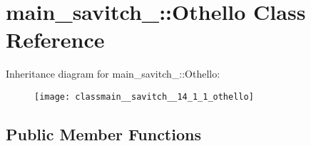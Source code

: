 \hypertarget{classmain__savitch__14_1_1_othello}{}\section{main\+\_\+savitch\+\_\+:\+:Othello Class Reference}
\label{classmain__savitch__14_1_1_othello}
Inheritance diagram for main\+\_\+savitch\+\_\+:\+:Othello\+:\begin{figure}[H]
\begin{center}
\leavevmode
\texttt{[image: classmain\_\_savitch\_\_14\_1\_1\_othello]}
\end{center}
\end{figure}
\subsection*{Public Member Functions}
